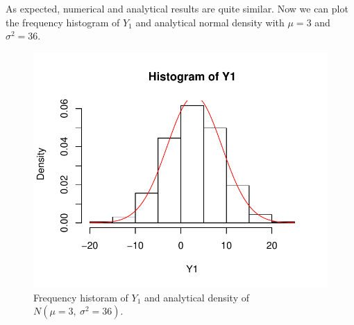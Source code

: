 \documentclass[12pt, a4paper]{article}\usepackage[]{graphicx}\usepackage[]{color}
\makeatletter
\def\maxwidth{ %
  \ifdim\Gin@nat@width>\linewidth
    \linewidth
  \else
    \Gin@nat@width
  \fi
}
\newenvironment{knitrout}{}{} %
\makeatother
\begin{document}
As expected, numerical and analytical results are quite similar.
Now we can plot the frequency histogram of $Y_1$ and analytical normal density with $\mu=3$ and $\sigma^2=36$.
\begin{knitrout}
\color{fgcolor}\begin{figure}[H]

{\centering \includegraphics[width=\maxwidth]{figure/ex1_1hist-1} 

}

\caption[Frequency historam of $Y_1$ and analytical density of $N(\mu=3,\ \sigma^2=36)$]{Frequency historam of $Y_1$ and analytical density of $N(\mu=3,\ \sigma^2=36)$.}\label{fig:ex1.1hist}
\end{figure}


\end{knitrout}
\end{document}
